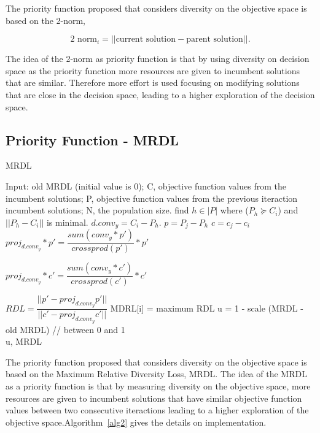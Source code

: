 The priority function proposed that considers diversity on the objective space is based on the 2-norm,

\begin{equation}
 \text{2 norm}_i = ||\text{current solution} - \text{parent solution}||.
\end{equation}

The idea of the 2-norm as priority function is that by using diversity on decision space as the priority function more resources are given to incumbent solutions that are similar. Therefore more effort is used focusing on modifying solutions that are close in the decision space, leading to a higher exploration of the decision space.


\subsection{Priority Function - MRDL} 


\begin{algorithm}[t]
	\caption{MRDL}\label{alg2}
	\begin{algorithmic}[1]
		
		\State Input: old MRDL (initial value is 0); C, objective function values from the incumbent solutions; P, objective function values from the previous iteraction incumbent solutions; N, the population size.
		\State find $h \in |P|$ where  ($P_h \succeq C_i$) and $||P_h - C_i  ||$ is minimal.
		\State $d.conv_{y} = C_i - P_h$.
		\State $p = P_j - P_h$
		\State $c = c_j - c_i$
		\State $proj_{d.conv_{y}}*p \prime = \dfrac{sum(conv_{y}*p \prime)}{crossprod(p \prime)}*p \prime$
		
		\State $ proj_{d.conv_{y}}*c \prime = \dfrac{sum(conv_{y}*c \prime)}{crossprod(c \prime)}*c \prime$
		
		\State $RDL = \dfrac{ ||p \prime - proj_{d.conv_{y}}p \prime|| }{||c \prime - proj_{d.conv_{y}}c \prime||}            $
		\EndFor
		MDRL[i] = maximum RDL
		\EndFor
		\State u = 1 - scale (MRDL - old MRDL) // between 0 and 1\\
	\Return u, MRDL
	\end{algorithmic}
\end{algorithm}

The priority function proposed that considers diversity on the objective space is based on the Maximum Relative Diversity Loss, MRDL. The idea of the MRDL as a priority function is that by measuring diversity on the objective space, more resources are given to incumbent solutions that have similar objective function values between two consecutive iteractions leading to a higher exploration of the objective space.Algorithm~\ref{alg2} gives the details on implementation.
 

